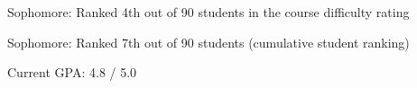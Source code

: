 

\begin{cventries}

\cventry
{} 
{}
{}
{} 
{
 \begin{cvitems}
\item {Sophomore: Ranked 4th out of 90 students in the course difficulty rating}
\item {Sophomore: Ranked 7th out of 90 students (cumulative student ranking)}
\item {Current GPA: 4.8 / 5.0}
 \end{cvitems}
}

\end{cventries}